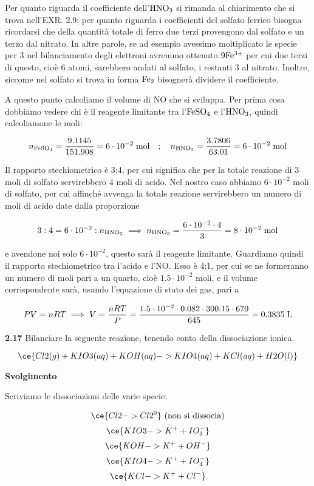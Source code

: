 Per quanto riguarda il coefficiente dell'$\rm HNO_3$ si rimanda al chiarimento che si trova nell'EXR. 2.9; per quanto riguarda i coefficienti del solfato ferrico bisogna ricordarsi che della quantità totale di ferro due terzi provengono dal solfato e un terzo dal nitrato. In altre parole, se ad esempio avessimo moltiplicato le specie per 3 nel bilanciamento degli elettroni avremmo ottenuto $\rm 9Fe^{3+}$ per cui due terzi di questo, cioè 6 atomi, sarebbero andati al solfato, i restanti 3 al nitrato. Inoltre, siccome nel solfato si trova in forma $\rm Fe_2$ bisognerà dividere il coefficiente.

A questo punto calcoliamo il volume di NO che si sviluppa. Per prima cosa dobbiamo vedere chi è il reagente limitante tra l'$\rm FeSO_4$ e l'$\rm HNO_3$, quindi calcoliamone le moli:

$$n_{\rm FeSO_4}=\frac{9.1145}{151.908}
=6 \cdot 10^{-2} \; \text{mol}
\quad;\quad
n_{\rm HNO_3}=\frac{3.7806}{63.01}
=6 \cdot 10^{-2} \; \rm mol$$

Il rapporto stechiometrico è 3:4, per cui significa che per la totale reazione di 3 moli di solfato servirebbero 4 moli di acido. Nel nostro caso abbiamo $6 \cdot 10^{-2}$ moli di solfato, per cui affinché avvenga la totale reazione servirebbero un numero di moli di acido date dalla proporzione

$$3:4=6 \cdot 10^{-2}:n_{\rm HNO_3}
\implies
n_{\rm HNO_3}=\frac{6 \cdot 10^{-2} \cdot 4}{3}
=8 \cdot 10^{-2} \; \rm mol$$

e avendone noi solo $6 \cdot 10^{-2}$, questo sarà il reagente limitante. Guardiamo quindi il rapporto stechiometrico tra l'acido e l'NO. Esso è 4:1, per cui se ne formeranno un numero di moli pari a un quarto, cioè $1.5 \cdot 10^{-2}$ moli, e il volume corrispondente sarà, usando l'equazione di stato dei gas, pari a 

$$PV=nRT
\implies
V=\frac{nRT}{P}
=\frac{1.5 \cdot 10^{-2} \cdot 0.082 \cdot 300.15 \cdot 670}{645}
=0.3835 \; \rm L$$

\textbf{2.17} Bilanciare la seguente reazione, tenendo conto della dissociazione ionica.

$$\ce{Cl2(g) + KIO3(aq) + KOH(aq) -> KIO4(aq) + KCl(aq) + H2O(l)}$$

\large\textbf{Svolgimento}\normalsize

\vspace{0.2cm}Scriviamo le dissociazioni delle varie specie:

$$\ce{Cl2 -> Cl2^0} \text{ (non si dissocia)}$$
$$\ce{KIO3 -> K^+ + IO_3^-}$$
$$\ce{KOH -> K^+ + OH^-}$$
$$\ce{KIO4 -> K^+ + IO_4^-}$$
$$\ce{KCl -> K^+ + Cl^-}$$

